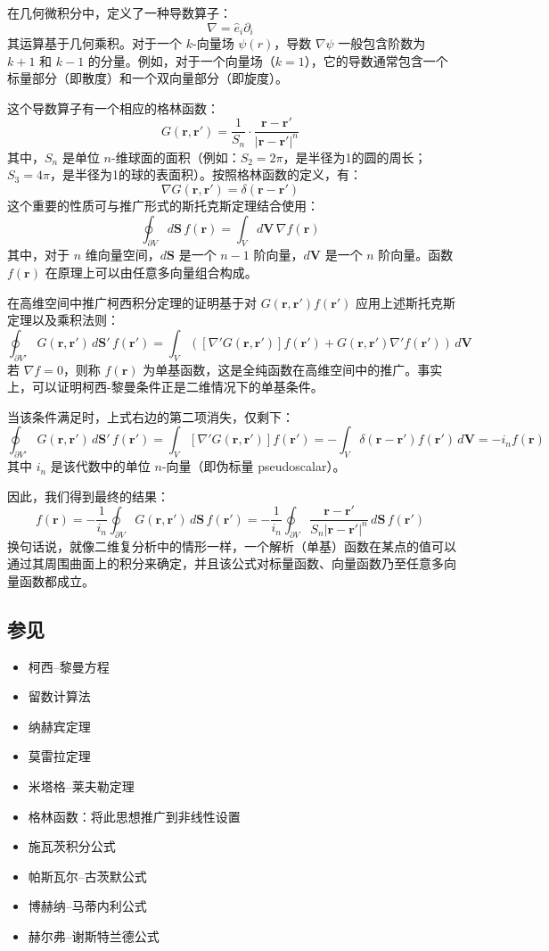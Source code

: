 在几何微积分中，定义了一种导数算子：
$$
\nabla = \hat{e}_i \partial_i~
$$
其运算基于几何乘积。对于一个 $k$-向量场 $\psi(r)$，导数 $\nabla \psi$ 一般包含阶数为 $k+1$ 和 $k-1$ 的分量。例如，对于一个向量场（$k = 1$），它的导数通常包含一个标量部分（即散度）和一个双向量部分（即旋度）。

这个导数算子有一个相应的格林函数：
$$
G(\mathbf{r}, \mathbf{r}') = \frac{1}{S_n} \cdot \frac{\mathbf{r} - \mathbf{r}'}{|\mathbf{r} - \mathbf{r}'|^n}~
$$
其中，$S_n$ 是单位 $n$-维球面的面积（例如：$S_2 = 2\pi$，是半径为1的圆的周长；$S_3 = 4\pi$，是半径为1的球的表面积）。按照格林函数的定义，有：
$$
\nabla G(\mathbf{r}, \mathbf{r}') = \delta(\mathbf{r} - \mathbf{r}')~
$$
这个重要的性质可与推广形式的斯托克斯定理结合使用：
$$
\oint_{\partial V} d\mathbf{S} \, f(\mathbf{r}) = \int_V d\mathbf{V} \, \nabla f(\mathbf{r})~
$$
其中，对于 $n$ 维向量空间，$d\mathbf{S}$ 是一个 $n-1$ 阶向量，$d\mathbf{V}$ 是一个 $n$ 阶向量。函数 $f(\mathbf{r})$ 在原理上可以由任意多向量组合构成。

在高维空间中推广柯西积分定理的证明基于对 $G(\mathbf{r}, \mathbf{r}') f(\mathbf{r}')$ 应用上述斯托克斯定理以及乘积法则：
$$
\oint_{\partial V'} G(\mathbf{r}, \mathbf{r}') \, d\mathbf{S}' \, f(\mathbf{r}') = \int_V \left( [\nabla' G(\mathbf{r}, \mathbf{r}')] f(\mathbf{r}') + G(\mathbf{r}, \mathbf{r}') \nabla' f(\mathbf{r}') \right) \, d\mathbf{V}~
$$
若 $\nabla f = 0$，则称 $f(\mathbf{r})$ 为单基函数，这是全纯函数在高维空间中的推广。事实上，可以证明柯西-黎曼条件正是二维情况下的单基条件。

当该条件满足时，上式右边的第二项消失，仅剩下：
$$
\oint_{\partial V'} G(\mathbf{r}, \mathbf{r}') \, d\mathbf{S}' \, f(\mathbf{r}') = \int_V [\nabla' G(\mathbf{r}, \mathbf{r}')] f(\mathbf{r}') = -\int_V \delta(\mathbf{r} - \mathbf{r}') f(\mathbf{r}') \, d\mathbf{V} = -i_n f(\mathbf{r})~
$$
其中 $i_n$ 是该代数中的单位 $n$-向量（即伪标量 pseudoscalar）。

因此，我们得到最终的结果：
$$
f(\mathbf{r}) = -\frac{1}{i_n} \oint_{\partial V} G(\mathbf{r}, \mathbf{r}') \, d\mathbf{S} \, f(\mathbf{r}') = -\frac{1}{i_n} \oint_{\partial V} \frac{\mathbf{r} - \mathbf{r}'}{S_n |\mathbf{r} - \mathbf{r}'|^n} \, d\mathbf{S} \, f(\mathbf{r}')~
$$
换句话说，就像二维复分析中的情形一样，一个解析（单基）函数在某点的值可以通过其周围曲面上的积分来确定，并且该公式对标量函数、向量函数乃至任意多向量函数都成立。
\subsection{参见}
\begin{itemize}
\item 柯西–黎曼方程
\item 留数计算法
\item 纳赫宾定理
\item 莫雷拉定理
\item 米塔格–莱夫勒定理
\item 格林函数：将此思想推广到非线性设置
\item 施瓦茨积分公式
\item 帕斯瓦尔–古茨默公式
\item 博赫纳–马蒂内利公式
\item 赫尔弗–谢斯特兰德公式
\end{itemize}
